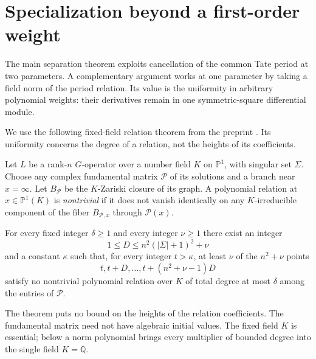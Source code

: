 \section{Specialization beyond a first-order weight}
\label{rev:scarcity-refinements}

The main separation theorem exploits cancellation of the common Tate
period at two parameters. A complementary argument works at one
parameter by taking a field norm of the period relation. Its value is
the uniformity in arbitrary polynomial weights: their derivatives
remain in one symmetric-square differential module.


We use the following fixed-field relation theorem from the preprint
\cite[Theorem~4.2(3)]{BaldiBinyaminiUrbanik2026}. Its uniformity concerns
the degree of a relation, not the heights of its coefficients.

\begin{theorem}
\label{thm:C-BBU}
Let $L$ be a rank-$n$ $G$-operator over a number field $K$ on
$\mathbb P^1$, with singular set $\Sigma$.  Choose any complex
fundamental matrix $\mathcal P$ of its solutions and a branch near
$x=\infty$.  Let $B_{\mathcal P}$ be the $K$-Zariski closure of its
graph.  A polynomial relation at $x\in\mathbb P^1(K)$ is
\emph{nontrivial} if it does not vanish identically on any
$K$-irreducible component of the fiber $B_{\mathcal P,x}$ through
$\mathcal P(x)$.

For every fixed integer $\delta\geq1$ and every integer $\nu\geq1$
there exist an integer
\[
 1\leq D\leq n^2(|\Sigma|+1)^2+\nu
\]
and a constant $\kappa$ such that, for every integer $t>\kappa$,
at least $\nu$ of the $n^2+\nu$ points
\[
 t,t+D,\ldots,t+(n^2+\nu-1)D
\]
satisfy no nontrivial polynomial relation over $K$ of total degree
at most $\delta$ among the entries of $\mathcal P$.
\end{theorem}

The theorem puts no bound on the heights of the relation coefficients.
The fundamental matrix need not have algebraic initial values.  The
fixed field $K$ is essential; below a norm polynomial brings every
multiplier of bounded degree into the single field $K=\mathbb Q$.

